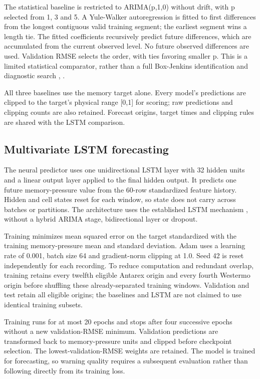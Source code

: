 \documentclass[10pt,a4paper,twocolumn]{article}
\begin{document}
The statistical baseline is restricted to ARIMA(p,1,0) without drift, with p selected from 1, 3 and 5. A Yule-Walker autoregression is fitted to first differences from the longest contiguous valid training segment; the earliest segment wins a length tie. The fitted coefficients recursively predict future differences, which are accumulated from the current observed level. No future observed differences are used. Validation RMSE selects the order, with ties favoring smaller p. This is a limited statistical comparator, rather than a full Box-Jenkins identification and diagnostic search \cite{ref2}, \cite{ref24}.

All three baselines use the memory target alone. Every model's predictions are clipped to the target's physical range [0,1] for scoring; raw predictions and clipping counts are also retained. Forecast origins, target times and clipping rules are shared with the LSTM comparison.

\subsection{Multivariate LSTM forecasting}

The neural predictor uses one unidirectional LSTM layer with 32 hidden units and a linear output layer applied to the final hidden output. It predicts one future memory-pressure value from the 60-row standardized feature history. Hidden and cell states reset for each window, so state does not carry across batches or partitions. The architecture uses the established LSTM mechanism \cite{ref26}, \cite{ref27} without a hybrid ARIMA stage, bidirectional layer or dropout.

Training minimizes mean squared error on the target standardized with the training memory-pressure mean and standard deviation. Adam uses a learning rate of 0.001, batch size 64 and gradient-norm clipping at 1.0. Seed 42 is reset independently for each recording. To reduce computation and redundant overlap, training retains every twelfth eligible Antarex origin and every fourth Westermo origin before shuffling these already-separated training windows. Validation and test retain all eligible origins; the baselines and LSTM are not claimed to use identical training subsets.

Training runs for at most 20 epochs and stops after four successive epochs without a new validation-RMSE minimum. Validation predictions are transformed back to memory-pressure units and clipped before checkpoint selection. The lowest-validation-RMSE weights are retained. The model is trained for forecasting, so warning quality requires a subsequent evaluation rather than following directly from its training loss.
\end{document}
